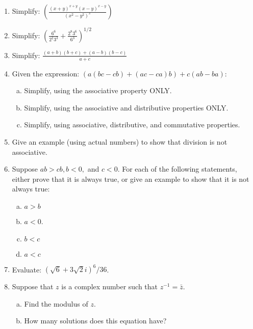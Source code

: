 
\begin{enumerate}[(1)]
\item
Simplify:
$\displaystyle{ \left(\frac{(x+y)^{x+y}(x-y)^{x-y}}{(x^2 - y^2)^x}\right)}$
\item
Simplify:
$ \displaystyle{\left( \frac{6^6}{2^2 3^3} +  \frac{2^8 3^6}{6^3}\right)^{1/2}} $
\item
Simplify:   $ \displaystyle{\frac{(a+b)(b+c) + (a-b)(b-c)}{a+c} }$
\item
Given the expression:  $( a(bc - cb) + (ac - ca)b) + c(ab - ba)$:
\begin{enumerate}[(a)]
\item
Simplify, using the associative property ONLY.
\item
Simplify, using the associative and distributive properties ONLY.
\item
Simplify, using associative, distributive, and commutative properties.
\end{enumerate}

\item
Give an example (using actual numbers) to show that division is not associative.
\item
Suppose $ab>cb, b < 0,$ and $c<0$.  For each of the following statements, either prove that it is always true, or give an example to show that
it is not always true:
\begin{enumerate}[(a)]
\item
$a > b$ \qquad 
\item
$a < 0$.
\item
$b < c$ \qquad 
\item
$a < c$ \qquad 
\end{enumerate}
\item
Evaluate: $(\sqrt{6}+3\sqrt{2}i)^6/36$.
\item
Suppose that $z$ is a complex number such that $z^{-1} = \bar{z}$.
\begin{enumerate}[(a)]
\item
 Find the modulus of $z$.
\item
How many solutions does this equation have?
\end{enumerate}
	

\end{enumerate}
